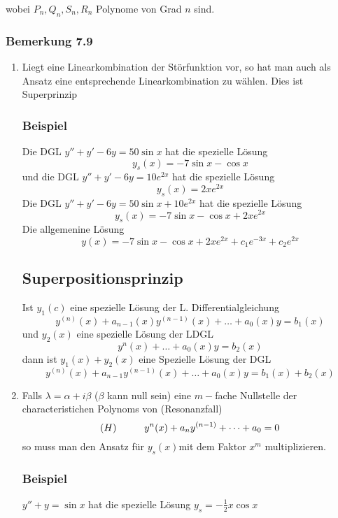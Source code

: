 wobei $P_n,Q_n,S_n,R_n$ Polynome von Grad $n$ sind.
\subsubsection*{Bemerkung 7.9}
\begin{enumerate}
\item {}Liegt eine Linearkombination der Störfunktion vor, so hat man auch als Ansatz eine entsprechende Linearkombination zu wählen. Dies ist Superprinzip
\subsubsection*{Beispiel}
Die DGL $y''+y'-6y=50\sin x$ hat die spezielle Lösung $$y_s(x)=-7\sin x-\cos x$$ und die DGL $y''+y'-6y=10e^{2x}$ hat die spezielle Lösung $$y_s(x)=2xe^{2x}$$Die DGL $y''+y'-6y=50\sin x+10e^{2x}$ hat die spezielle Lösung $$y_s(x)=-7\sin x-\cos x+2xe^{2x}$$ Die allgemenine Lösung $$y(x)=-7\sin x -\cos x+2xe^{2x}+c_1e^{-3x}+c_2e^{2x}$$
\subsection*{Superpositionsprinzip}
Ist $y_1(c)$ eine spezielle Lösung der L. Differentialgleichung $$y^{(n)}(x)+a_{n-1}(x)y^{(n-1)}(x)+\dots +a_0(x)y=b_1(x)$$ und $y_2(x)$ eine spezielle Lösung der LDGL $$y^n(x)+\dots +a_0(x)y=b_2(x)$$ dann ist $y_1(x)+y_2(x)$ eine Spezielle Lösung der DGL $$y^{(n)}(x)+a_{n-1}y^{(n-1)}(x)+\dots+a_0(x)y=b_1(x)+b_2(x)$$
\item Falls $\lambda=\alpha +i\beta$ ($\beta$ kann null sein) eine $m-$fache Nullstelle der characteristichen Polynoms von (Resonanzfall) $$(H)\hspace{10mm}y^n(x)+a_ny^{(n-1)}+\dots +a_0=0$$so muss man den Ansatz für $y_s(x)$mit dem Faktor $x^m$ multiplizieren.
\subsubsection*{Beispiel}
$y''+y=\sin x$ hat die spezielle Lösung $y_s=-\frac{1}{2}x\cos x$



\begin{figure}[ht]
\begin{minipage}[b]{0.45\linewidth}
\begin{center}
\end{center}


\end{minipage}
\end{figure}
\end{enumerate}
